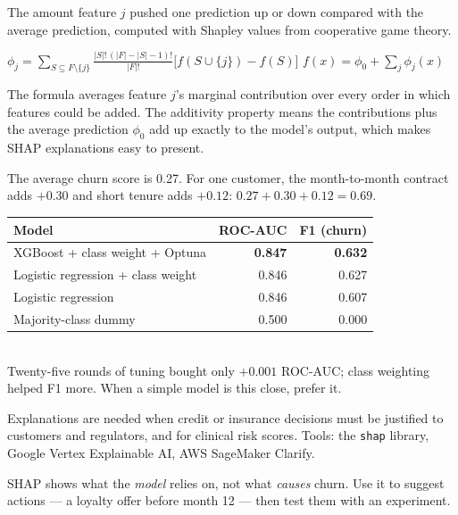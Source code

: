 \documentclass[11pt,a4paper]{article}
\begin{document}
\begin{bdef}
The amount feature $j$ pushed one prediction up or down compared with the average prediction, computed with Shapley values from cooperative game theory.
\end{bdef}
\begin{bmath}
$\displaystyle\phi_j=\sum_{S\subseteq F\setminus\{j\}}\frac{|S|!\,(|F|-|S|-1)!}{|F|!}\big[f(S\cup\{j\})-f(S)\big]$ \qquad $f(x)=\phi_0+\sum_j\phi_j(x)$
\end{bmath}
The formula averages feature $j$'s marginal contribution over every order in which features could be added. The additivity property means the contributions plus the average prediction $\phi_0$ add up exactly to the model's output, which makes SHAP explanations easy to present.
\begin{bex}
The average churn score is 0.27. For one customer, the month-to-month contract adds $+0.30$ and short tenure adds $+0.12$: $0.27+0.30+0.12=0.69$.
\end{bex}
\begin{bres}
\begin{tabular}{lrr}
\toprule
Model & ROC-AUC & F1 (churn)\\
\midrule
XGBoost + class weight + Optuna & \textbf{0.847} & \textbf{0.632}\\
Logistic regression + class weight & 0.846 & 0.627\\
Logistic regression & 0.846 & 0.607\\
Majority-class dummy & 0.500 & 0.000\\
\bottomrule
\end{tabular}\\[3pt]
Twenty-five rounds of tuning bought only $+0.001$ ROC-AUC; class weighting helped F1 more. When a simple model is this close, prefer it.
\end{bres}
\begin{bapp}
Explanations are needed when credit or insurance decisions must be justified to customers and regulators, and for clinical risk scores. Tools: the \texttt{shap} library, Google Vertex Explainable AI, AWS SageMaker Clarify.
\end{bapp}
\begin{bwarn}
SHAP shows what the \emph{model} relies on, not what \emph{causes} churn. Use it to suggest actions --- a loyalty offer before month 12 --- then test them with an experiment.
\end{bwarn}
\end{document}
